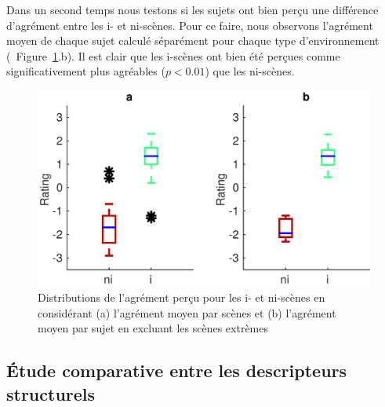 Dans un second temps nous testons si les sujets ont bien perçu une différence d'agrément entre les i- et ni-scènes. Pour ce faire, nous observons l'agrément moyen de chaque sujet calculé séparément pour chaque type d'environnement (\Cf~Figure~\ref{fig:compA}.b). Il est clair que les i-scènes ont bien été perçues comme significativement plus agréables ($p<0.01$) que les ni-scènes.

\begin{figure}[bth]
        \myfloatalign
        \includegraphics[width=.8\linewidth]{gfxXpUrbanSoundscape/xp2_1-eps-converted-to}
       \caption[Distributions de l'agrément perçu pour les i- et ni-scènes]{Distributions de l'agrément perçu pour les i- et ni-scènes en considérant (a) l'agrément moyen par scènes et (b) l'agrément moyen par sujet en excluant les scènes extrèmes}\label{fig:compA}
\end{figure}
 
\subsection{Étude comparative entre les descripteurs structurels}

